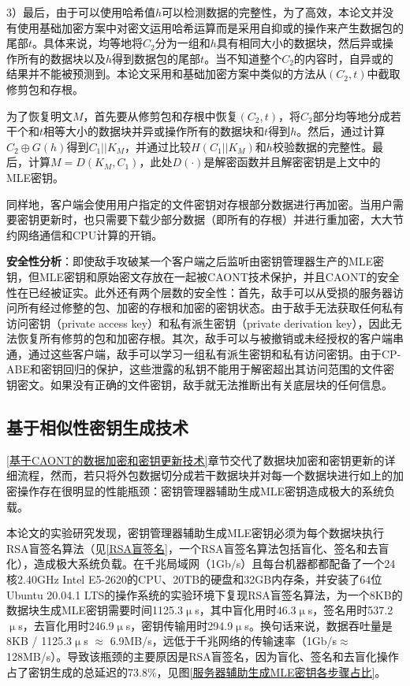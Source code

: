 \documentclass[promaster]{thesis-uestc}
\begin{document}
3）最后，由于可以使用哈希值$h$可以检测数据的完整性，为了高效，本论文并没有使用基础加密方案中对密文运用哈希运算而是采用自抑或的操作来产生数据包的尾部$t$。具体来说，均等地将$C_2$分为一组和$h$具有相同大小的数据块，然后异或操作所有的数据块以及$h$得到数据包的尾部$t$。当不知道整个$C_2$的内容时，自异或的结果并不能被预测到。本论文采用和基础加密方案中类似的方法从$(C_2, t)$中截取修剪包和存根。

为了恢复明文$M$，首先要从修剪包和存根中恢复$(C_2, t)$，将$C_2$部分均等地分成若干个和$t$相等大小的数据块并异或操作所有的数据块和$t$得到$h$。然后，通过计算$C_2 \oplus G(h)$得到$C_1||K_M$，并通过比较$H(C_1||K_M)$和$h$校验数据的完整性。最后，计算$M = D(K_M, C_1)$，此处$D(\cdot)$是解密函数并且解密密钥是上文中的MLE密钥。

同样地，客户端会使用用户指定的文件密钥对存根部分数据进行再加密。当用户需要密钥更新时，也只需要下载少部分数据（即所有的存根）并进行重加密，大大节约网络通信和CPU计算的开销。

\textbf{安全性分析}：即使敌手攻破某一个客户端之后监听由密钥管理器生产的MLE密钥，但MLE密钥和原始密文存放在一起被CAONT技术保护，并且CAONT的安全性在\cite{li2015cdstore}已经被证实。此外还有两个层数的安全性：首先，敌手可以从受损的服务器访问所有经过修整的包、加密的存根和加密的密钥状态。由于敌手无法获取任何私有访问密钥（private access key）和私有派生密钥（private derivation key），因此无法恢复所有修剪的包和加密存根。其次，敌手可以与被撤销或未经授权的客户端串通，通过这些客户端，敌手可以学习一组私有派生密钥和私有访问密钥。由于CP-ABE和密钥回归的保护，这些泄露的私钥不能用于解密超出其访问范围的文件密钥密文。如果没有正确的文件密钥，敌手就无法推断出有关底层块的任何信息。

\subsection{基于相似性密钥生成技术}
\ref{基于CAONT的数据加密和密钥更新技术}章节交代了数据块加密和密钥更新的详细流程，然而，若只将外包数据切分成若干数据块并对每一个数据块进行如上的加密操作存在很明显的性能瓶颈：密钥管理器辅助生成MLE密钥造成极大的系统负载。

本论文的实验研究发现，密钥管理器辅助生成MLE密钥必须为每个数据块执行RSA盲签名算法（见\ref{RSA盲签名}，一个RSA盲签名算法包括盲化、签名和去盲化），造成极大系统负载。在千兆局域网（1Gb/s）且每台机器都都配备了一个24核2.40GHz Intel E5-2620的CPU、20TB的硬盘和32GB内存条，并安装了64位Ubuntu 20.04.1 LTS的操作系统的实验环境下复现RSA盲签名算法，为一个8KB的数据块生成MLE密钥需要时间1125.3$\upmu$s，其中盲化用时46.3$\upmu$s，签名用时537.2$\upmu$s，去盲化用时246.9$\upmu$s，密钥传输用时294.9$\upmu$s。换句话来说，数据吞吐量是8KB / 1125.3$\upmu$s $\approx$ 6.9MB/s，远低于千兆网络的传输速率（1Gb/s$\approx$128MB/s）。导致该瓶颈的主要原因是RSA盲签名，因为盲化、签名和去盲化操作占了密钥生成的总延迟的73.8\%，见图\ref{服务器辅助生成MLE密钥各步骤占比}。
\end{document}
